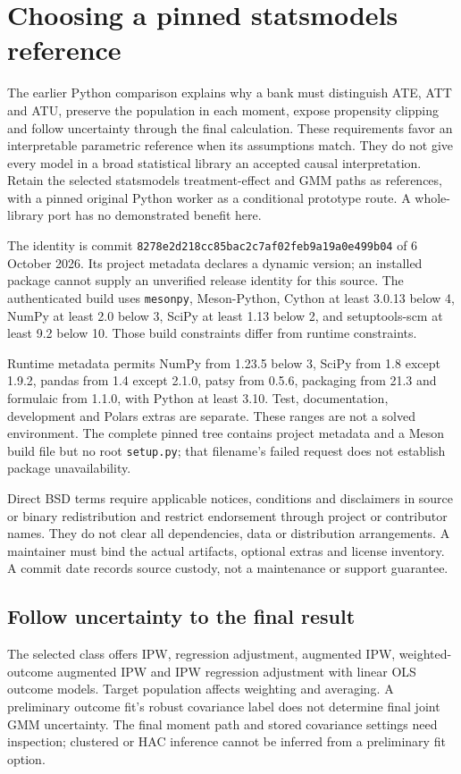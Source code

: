 \section{Choosing a pinned statsmodels reference}
\label{sec:exec24-statsmodels-reuse}
The earlier Python comparison explains why a bank must distinguish ATE, ATT and ATU, preserve the population in each moment, expose propensity clipping and follow uncertainty through the final calculation. These requirements favor an interpretable parametric reference when its assumptions match. They do not give every model in a broad statistical library an accepted causal interpretation. Retain the selected statsmodels treatment-effect and GMM paths as references, with a pinned original Python worker as a conditional prototype route. A whole-library port has no demonstrated benefit here.~\citep{exec20_python_effect_source,exec20_python_effect_reference}

The identity is commit \texttt{8278e2d218cc85bac2c7af02feb9a19a0e499b04} of 6 October 2026. Its project metadata declares a dynamic version; an installed package cannot supply an unverified release identity for this source. The authenticated build uses \texttt{mesonpy}, Meson-Python, Cython at least 3.0.13 below 4, NumPy at least 2.0 below 3, SciPy at least 1.13 below 2, and setuptools-scm at least 9.2 below 10. Those build constraints differ from runtime constraints.~\citep{exec24_statsmodels_distribution}

Runtime metadata permits NumPy from 1.23.5 below 3, SciPy from 1.8 except 1.9.2, pandas from 1.4 except 2.1.0, patsy from 0.5.6, packaging from 21.3 and formulaic from 1.1.0, with Python at least 3.10. Test, documentation, development and Polars extras are separate. These ranges are not a solved environment. The complete pinned tree contains project metadata and a Meson build file but no root \texttt{setup.py}; that filename's failed request does not establish package unavailability.~\citep{exec24_statsmodels_distribution}

Direct BSD terms require applicable notices, conditions and disclaimers in source or binary redistribution and restrict endorsement through project or contributor names. They do not clear all dependencies, data or distribution arrangements. A maintainer must bind the actual artifacts, optional extras and license inventory. A commit date records source custody, not a maintenance or support guarantee.~\citep{exec20_python_effect_source,exec24_statsmodels_distribution}

\subsection{Follow uncertainty to the final result}
The selected class offers IPW, regression adjustment, augmented IPW, weighted-outcome augmented IPW and IPW regression adjustment with linear OLS outcome models. Target population affects weighting and averaging. A preliminary outcome fit's robust covariance label does not determine final joint GMM uncertainty. The final moment path and stored covariance settings need inspection; clustered or HAC inference cannot be inferred from a preliminary fit option.~\citep{exec20_python_effect_source}

